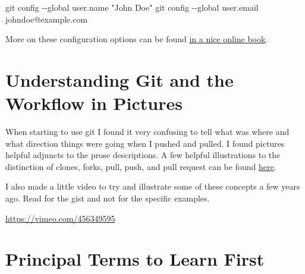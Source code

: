 \documentclass[
  letterpaper,
  DIV=11,
  numbers=noendperiod]{scrreprt}
\newenvironment{Shaded}{\begin{snugshade}}{\end{snugshade}}
\newcommand{\AttributeTok}[1]{\textcolor[rgb]{0.40,0.45,0.13}{#1}}
\newcommand{\FunctionTok}[1]{\textcolor[rgb]{0.28,0.35,0.67}{#1}}
\newcommand{\NormalTok}[1]{\textcolor[rgb]{0.00,0.23,0.31}{#1}}
\newcommand{\StringTok}[1]{\textcolor[rgb]{0.13,0.47,0.30}{#1}}
\begin{document}
\begin{Shaded}
\begin{Highlighting}[]
\FunctionTok{git}\NormalTok{ config }\AttributeTok{{-}{-}global}\NormalTok{ user.name }\StringTok{"John Doe"}
\FunctionTok{git}\NormalTok{ config }\AttributeTok{{-}{-}global}\NormalTok{ user.email johndoe@example.com}
\end{Highlighting}
\end{Shaded}

More on these configuration options can be found
\href{https://git-scm.com/book/en/v2/Getting-Started-First-Time-Git-Setup}{in
a nice online book}.

\section{Understanding Git and the Workflow in
Pictures}\label{understanding-git-and-the-workflow-in-pictures}

When starting to use git I found it very confusing to tell what was
where and what direction things were going when I pushed and pulled. I
found pictures helpful adjuncts to the prose descriptions. A few helpful
illustrations to the distinction of clones, forks, pull, push, and pull
request can be found
\href{https://www.toolsqa.com/git/difference-between-git-clone-and-git-fork/}{here}.

I also made a little video to try and illustrate some of these concepts
a few years ago. Read for the gist and not for the specific examples.

\url{https://vimeo.com/456349595}

\section{Principal Terms to Learn
First}\label{principal-terms-to-learn-first}
\end{document}
